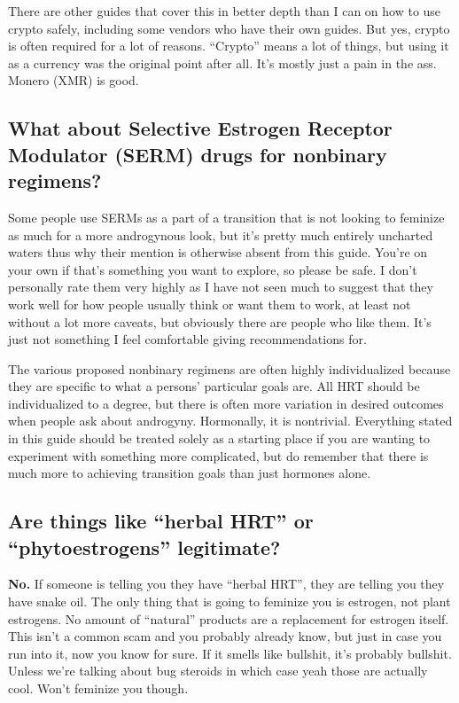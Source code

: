\documentclass{article}
\begin{document}
There are other guides that cover this in better depth than I can on how to use crypto safely, including some vendors who have their own guides. But yes, crypto is often required for a lot of reasons. “Crypto” means a lot of things, but using it as a currency was the original point after all. It’s mostly just a pain in the ass. Monero (XMR) is good.

\subsection{What about Selective Estrogen Receptor Modulator (SERM) drugs for nonbinary regimens?}

Some people use SERMs as a part of a transition that is not looking to feminize as much for a more androgynous look, but it’s pretty much entirely uncharted waters thus why their mention is otherwise absent from this guide. You’re on your own if that’s something you want to explore, so please be safe. I don’t personally rate them very highly as I have not seen much to suggest that they work well for how people usually think or want them to work, at least not without a lot more caveats, but obviously there are people who like them. It's just not something I feel comfortable giving recommendations for.

The various proposed nonbinary regimens are often highly individualized because they are specific to what a persons' particular goals are. All HRT should be individualized to a degree, but there is often more variation in desired outcomes when people ask about androgyny. Hormonally, it is nontrivial. Everything stated in this guide should be treated solely as a starting place if you are wanting to experiment with something more complicated, but do remember that there is much more to achieving transition goals than just hormones alone.

\subsection{Are things like “herbal HRT” or “phytoestrogens” legitimate?}

\textbf{No.} If someone is telling you they have “herbal HRT”, they are telling you they have snake oil. The only thing that is going to feminize you is estrogen, not plant estrogens. No amount of “natural” products are a replacement for estrogen itself. This isn’t a common scam and you probably already know, but just in case you run into it, now you know for sure. If it smells like bullshit, it’s probably bullshit. Unless we’re talking about bug steroids in which case yeah those are actually cool. Won’t feminize you though.
\end{document}
